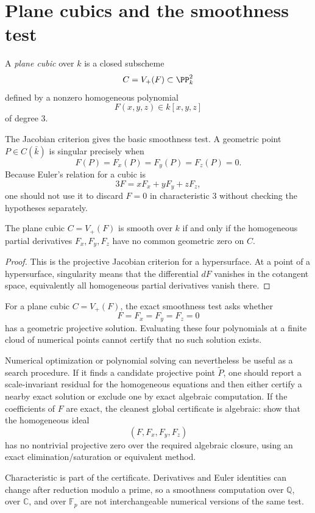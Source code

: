\section{Plane cubics and the smoothness test}

\begin{definition}\label{def:vi43-plane-cubic}
A \emph{plane cubic} over \(k\) is a closed subscheme
\[
  C=V_+(F)\subset\PP^2_k
\]
defined by a nonzero homogeneous polynomial
\[
  F(x,y,z)\in k[x,y,z]
\]
of degree \(3\).
\end{definition}

The Jacobian criterion gives the basic smoothness test.  A geometric point \(P\in C(\bar k)\) is singular precisely when
\[
  F(P)=F_x(P)=F_y(P)=F_z(P)=0.
\]
Because Euler's relation for a cubic is
\[
  3F=xF_x+yF_y+zF_z,
\]
one should not use it to discard \(F=0\) in characteristic \(3\) without checking the hypotheses separately.

\begin{proposition}\label{prop:vi43-smoothness}
The plane cubic \(C=V_+(F)\) is smooth over \(k\) if and only if the homogeneous partial derivatives \(F_x,F_y,F_z\) have no common geometric zero on \(C\).
\end{proposition}

\begin{proof}
This is the projective Jacobian criterion for a hypersurface.  At a point of a hypersurface, singularity means that the differential \(dF\) vanishes in the cotangent space, equivalently all homogeneous partial derivatives vanish there.
\end{proof}

\begin{remark}
For a plane cubic \(C=V_+(F)\), the exact smoothness test asks whether
\[
F=F_x=F_y=F_z=0
\]
has a geometric projective solution. Evaluating these four polynomials at a
finite cloud of numerical points cannot certify that no such solution exists.

Numerical optimization or polynomial solving can nevertheless be useful as a
search procedure. If it finds a candidate projective point
\(\widetilde P\), one should report a scale-invariant residual for the
homogeneous equations and then either certify a nearby exact solution or
exclude one by exact algebraic computation. If the coefficients of \(F\) are
exact, the cleanest global certificate is algebraic: show that the homogeneous
ideal
\[
(F,F_x,F_y,F_z)
\]
has no nontrivial projective zero over the required algebraic closure, using an
exact elimination/saturation or equivalent method.

Characteristic is part of the certificate. Derivatives and Euler identities
can change after reduction modulo a prime, so a smoothness computation over
\(\mathbb Q\), over \(\mathbb C\), and over \(\mathbb F_p\) are not
interchangeable numerical versions of the same test.
\end{remark}

